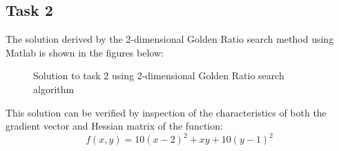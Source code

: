\documentclass{article}
\begin{document}
\subsection{Task 2}
The solution derived by the 2-dimensional Golden Ratio search method using Matlab is shown in the figures below:
\FloatBarrier
\begin{figure}[h!]
\begin{adjustbox}{max width=1.5\linewidth,center}
    \centering
\end{adjustbox}
    \caption{Solution to task 2 using 2-dimensional Golden Ratio search algorithm}
    \label{fig:task2}%
\end{figure}
\FloatBarrier
\noindent This solution can be verified by inspection of the characteristics of both the gradient vector and Hessian matrix of the function:
\begin{equation*}
    f(x,y) = 10(x-2)^{2} + xy + 10(y-1)^{2}
\end{equation*}
\end{document}
